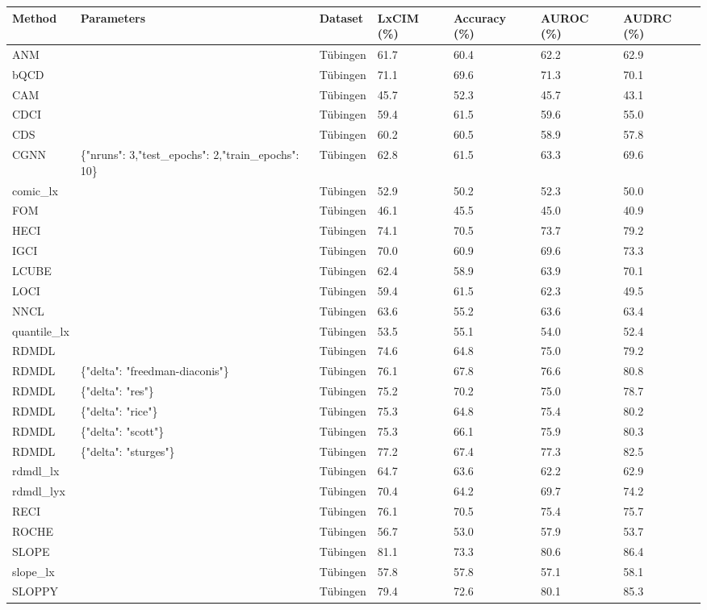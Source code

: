 \begin{tabular}{lllllll}
\toprule
Method & Parameters & Dataset & LxCIM (\%) & Accuracy (\%) & AUROC (\%) & AUDRC (\%) \\
\midrule
ANM &  & Tübingen & 61.7 & 60.4 & 62.2 & 62.9 \\
bQCD &  & Tübingen & 71.1 & 69.6 & 71.3 & 70.1 \\
CAM &  & Tübingen & 45.7 & 52.3 & 45.7 & 43.1 \\
CDCI &  & Tübingen & 59.4 & 61.5 & 59.6 & 55.0 \\
CDS &  & Tübingen & 60.2 & 60.5 & 58.9 & 57.8 \\
CGNN & \{"nruns": 3,"test\_epochs": 2,"train\_epochs": 10\} & Tübingen & 62.8 & 61.5 & 63.3 & 69.6 \\
comic\_lx &  & Tübingen & 52.9 & 50.2 & 52.3 & 50.0 \\
FOM &  & Tübingen & 46.1 & 45.5 & 45.0 & 40.9 \\
HECI &  & Tübingen & 74.1 & 70.5 & 73.7 & 79.2 \\
IGCI &  & Tübingen & 70.0 & 60.9 & 69.6 & 73.3 \\
LCUBE &  & Tübingen & 62.4 & 58.9 & 63.9 & 70.1 \\
LOCI &  & Tübingen & 59.4 & 61.5 & 62.3 & 49.5 \\
NNCL &  & Tübingen & 63.6 & 55.2 & 63.6 & 63.4 \\
quantile\_lx &  & Tübingen & 53.5 & 55.1 & 54.0 & 52.4 \\
RDMDL &  & Tübingen & 74.6 & 64.8 & 75.0 & 79.2 \\
RDMDL & \{"delta": "freedman-diaconis"\} & Tübingen & 76.1 & 67.8 & 76.6 & 80.8 \\
RDMDL & \{"delta": "res"\} & Tübingen & 75.2 & 70.2 & 75.0 & 78.7 \\
RDMDL & \{"delta": "rice"\} & Tübingen & 75.3 & 64.8 & 75.4 & 80.2 \\
RDMDL & \{"delta": "scott"\} & Tübingen & 75.3 & 66.1 & 75.9 & 80.3 \\
RDMDL & \{"delta": "sturges"\} & Tübingen & 77.2 & 67.4 & 77.3 & 82.5 \\
rdmdl\_lx &  & Tübingen & 64.7 & 63.6 & 62.2 & 62.9 \\
rdmdl\_lyx &  & Tübingen & 70.4 & 64.2 & 69.7 & 74.2 \\
RECI &  & Tübingen & 76.1 & 70.5 & 75.4 & 75.7 \\
ROCHE &  & Tübingen & 56.7 & 53.0 & 57.9 & 53.7 \\
SLOPE &  & Tübingen & 81.1 & 73.3 & 80.6 & 86.4 \\
slope\_lx &  & Tübingen & 57.8 & 57.8 & 57.1 & 58.1 \\
SLOPPY &  & Tübingen & 79.4 & 72.6 & 80.1 & 85.3 \\
\bottomrule
\end{tabular}
